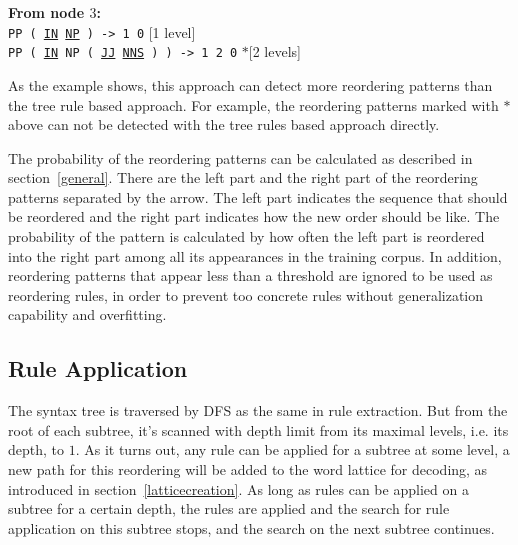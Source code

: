 \textbf{From node $3$:}\\
\texttt{PP ( \ul{IN} \ul{NP} ) -> 1 0} \hfill [1 level]\\
\texttt{PP ( \ul{IN} NP ( \ul{JJ} \ul{NNS} ) ) -> 1 2 0} \hfill $*$[2 levels]

As the example shows, this approach can detect more reordering patterns than the tree rule based approach. For example, the reordering patterns marked with $*$ above can not be detected with the tree rules based approach directly.

The probability of the reordering patterns can be calculated as described in section~\ref{general}. There are the left part and the right part of the reordering patterns separated by the arrow. The left part indicates the sequence that should be reordered and the right part indicates how the new order should be like. The probability of the pattern is calculated by how often the left part is reordered into the right part among all its appearances in the training corpus. In addition, reordering patterns that appear less than a threshold are ignored to be used as reordering rules, in order to prevent too concrete rules without generalization capability and overfitting.

\subsection{Rule Application}

The syntax tree is traversed by \ac{DFS} as the same in rule extraction. But from the root of each subtree, it's scanned with depth limit from its maximal levels, i.e. its depth, to $1$. As it turns out, any rule can be applied for a subtree at some level, a new path for this reordering will be added to the word lattice for decoding, as introduced in section~\ref{latticecreation}. As long as rules can be applied on a subtree for a certain depth, the rules are applied and the search for rule application on this subtree stops, and the search on the next subtree continues. 

